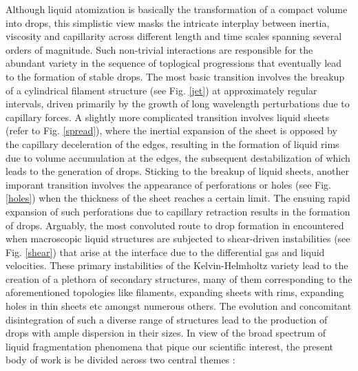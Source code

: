 Although liquid atomization is basically the transformation of a compact volume into drops,
this simplistic view masks the intricate interplay between inertia, viscosity and capillarity across 
different length and time scales spanning several orders of magnitude.  
Such non-trivial interactions are responsible for the abundant variety in the sequence 
of toplogical progressions that eventually lead to the formation of stable drops. 
The most basic transition involves the breakup of a cylindrical filament structure 
(see Fig. \ref{jet}) at approximately regular intervals, driven primarily by the 
growth of long wavelength perturbations due to capillary forces. 
A slightly more complicated transition involves liquid sheets (refer to Fig. \ref{spread}), 
where the inertial expansion of the sheet is opposed by the capillary deceleration of the edges,
resulting in the formation of liquid rims due to volume accumulation at the edges, 
the subsequent destabilization of which leads to the generation of drops. 
Sticking to the breakup of liquid sheets, another imporant transition involves the  
appearance of perforations or holes (see Fig. \ref{holes}) when the thickness of the sheet reaches a certain limit. 
The ensuing rapid expansion of such perforations due to capillary retraction results in the formation of drops. 
Arguably, the most convoluted route to drop formation in encountered when macroscopic 
liquid structures are subjected to shear-driven instabilities (see Fig. \ref{shear}) that 
arise at the interface due to the differential gas and liquid velocities. 
These primary instabilities of the Kelvin-Helmholtz \cite{khi} variety lead to the creation 
of a plethora of secondary structures, many of them corresponding to the aforementioned 
topologies like filaments, expanding sheets with rims, expanding holes in thin sheets etc 
amongst numerous others. The evolution and concomitant disintegration of such a diverse range
of structures lead to the production of drops with ample dispersion in their sizes.  
In view of the broad spectrum of liquid fragmentation phenomena that pique our scientific interest, 
the present body of work is be divided across two central themes :  

